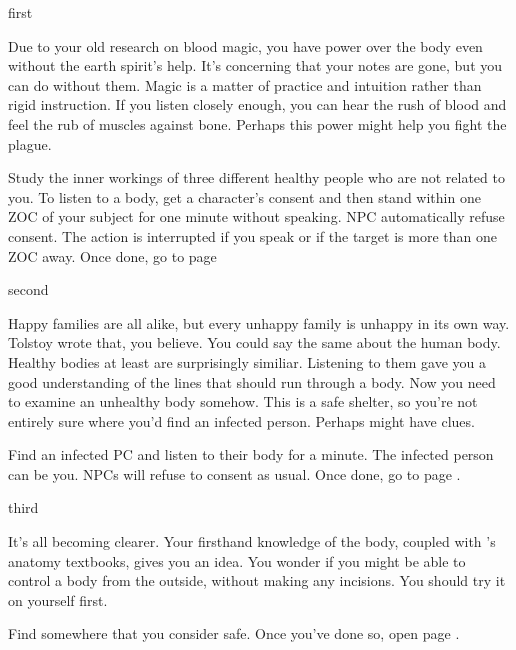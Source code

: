 \documentclass[greennotebook]{Pestilence} %
\begin{document}
\startnotebook{\nRebelLab{}}

\begin{page}{first}

Due to your old research on blood magic, you have power over the body even without the earth spirit's help. It's concerning that your notes are gone, but you can do without them. Magic is a matter of practice and intuition rather than rigid instruction. If you listen closely enough, you can hear the rush of blood and feel the rub of muscles against bone. Perhaps this power might help you fight the plague. 

Study the inner workings of three different healthy people who are not related to you. To listen to a body, get a character's consent and then stand within one ZOC of your subject for one minute without speaking. NPC automatically refuse consent. The action is interrupted if you speak or if the target is more than one ZOC away. Once done, go to page 

\end{page}

\begin{page}{second}

Happy families are all alike, but every unhappy family is unhappy in its own way. Tolstoy wrote that, you believe. You could say the same about the human body. Healthy bodies at least are surprisingly similiar. Listening to them gave you a good understanding of the lines that should run through a body. Now you need to examine an unhealthy body somehow. This is a safe shelter, so you're not entirely sure where you'd find an infected person. Perhaps \cOutsider{} might have clues.

Find an infected PC and listen to their body for a minute. The infected person can be you. NPCs will refuse to consent as usual. Once done, go to page .

\end{page}

\begin{page}{third}

It's all becoming clearer. Your firsthand knowledge of the body, coupled with \cOutsider{}'s anatomy textbooks, gives you an idea. You wonder if you might be able to control a body from the outside, without making any incisions. You should try it on yourself first.

Find somewhere that you consider safe. Once you've done so, open page .

\end{page}
\end{document}
